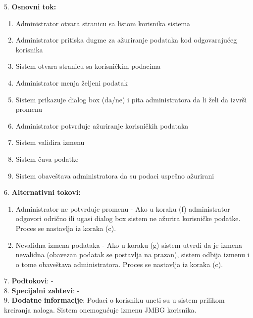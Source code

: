 \documentclass{article}
\begin{document}
5. \textbf{Osnovni tok:} 
\begin{enumerate} [label=(\alph*)]
\item Administrator otvara stranicu sa listom korisnika sistema
\item Administrator pritiska dugme za ažuriranje podataka kod odgovarajućeg korisnika
\item Sistem otvara stranicu sa korisničkim podacima
\item Administrator menja željeni podatak
\item Sistem prikazuje dialog box (da/ne) i pita administratora da li želi da izvrši promenu
\item Administrator potvrđuje ažuriranje korisničkih podataka
\item Sistem validira izmenu
\item Sistem čuva podatke
\item Sistem obaveštava administratora da su podaci uspešno ažurirani
\end{enumerate}

6. \textbf{Alternativni tokovi:}
\begin{enumerate} [label=(\roman*)]
    \item Administrator ne potvrđuje promenu - Ako u koraku (f) administrator odgovori odrično ili ugasi dialog box sistem ne ažurira korisničke podatke. Proces se nastavlja iz koraka (c).
    \item Nevalidna izmena podataka - Ako u koraku (g) sistem utvrdi da je izmena nevalidna (obavezan podatak se postavlja na prazan), sistem odbija izmenu i o tome obaveštava administratora. Proces se nastavlja iz koraka (c).
\end{enumerate}

7. \textbf{Podtokovi}: - \\

8. \textbf{Specijalni zahtevi}: - \\

9. \textbf{Dodatne informacije}: Podaci o korisniku uneti su u sistem prilikom kreiranja naloga. Sistem onemogućuje izmenu JMBG korisnika. \\
\end{document}

